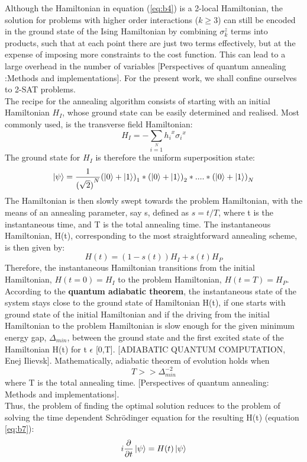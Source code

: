\documentclass[12]{article}
\begin{document}
Although the Hamiltonian in equation (\ref{eq:b4}) is a 2-local Hamiltonian, the solution for problems with higher order interactions ($k \geq 3$) can still be encoded in the ground state of the Ising Hamiltonian by combining $\sigma_k^z$ terms into products, such that at each point there are just two terms effectively, but at the expense of imposing more constraints to the cost function. This can lead to a large overhead in the number of variables [Perspectives of quantum annealing :Methods and implementations]. For the present work, we shall confine ourselves to 2-SAT problems. \\

The recipe for the annealing algorithm consists of starting with an initial Hamiltonian $H_I$, whose ground state can be easily determined and realised. Most commonly used, is the transverse field Hamiltonian: 
\begin{equation}
H_I=-\sum\limits_{i=1}\limits^{N}{h_i}^x{\sigma_i}^x \label{eq:b5}
\end{equation}
The ground state for $H_I$ is therefore the uniform superposition state: 
\begin{equation}
\ket{\psi}=\frac{1}{{(\sqrt{2})}^N}{(\ket{0}+\ket{1})}_1*{(\ket{0}+\ket{1})}_2*....*{(\ket{0}+\ket{1})}_N \label{eq:b6}
\end{equation}
The Hamiltonian is then slowly swept towards the problem Hamiltonian, with the means of an annealing parameter, say s, defined as $s=t/T$, where t is the instantaneous time, and T is the total annealing time. The instantaneous Hamiltonian, H(t), corresponding to the most straightforward annealing scheme, is then given by: 
\begin{equation}
H(t)= (1-s(t))H_I + s(t)H_P \label{eq:b7}
\end{equation}
Therefore, the instantaneous Hamiltonian transitions from the initial Hamiltonian, $H(t=0)=H_I$ to the problem Hamiltonian, $H(t=T)=H_P$. \\


According to the \textbf{quantum adiabatic theorem}, the instantaneous state of the system stays close to the ground state of Hamiltonian H(t), if one starts with ground state of the initial Hamiltonian and if the driving from the initial Hamiltonian to the problem Hamiltonian is slow enough for the given minimum energy gap, $\Delta_{min}$, between the ground state and the first excited state of the Hamiltonian H(t) for t $\epsilon$ [0,T]. [ADIABATIC QUANTUM COMPUTATION, Enej Ilievsk]. Mathematically, adiabatic theorem of evolution holds when 
\begin{equation}
T>> {\Delta}_{min}^{-2} \label{eq:b8}
\end{equation}
where T is the total annealing time. [Perspectives of quantum annealing: Methods and implementations].\\
Thus, the problem of finding the optimal solution reduces to the problem of solving the time dependent Schr{\"o}dinger equation for the resulting H(t) (equation \ref{eq:b7}):
\begin{equation}
i\frac{\partial}{\partial t}\ket{\psi}=H(t)\ket{\psi}    \label{eq:n9}
\end{equation}
\end{document}

